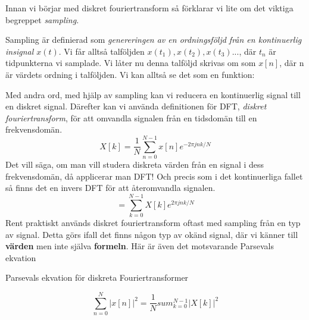 \documentclass{article}
\begin{document}
Innan vi börjar med diskret fouriertransform så förklarar vi lite om
det viktiga begreppet \emph{sampling.}

Sampling är definierad som \emph{genereringen av en ordningsföljd från en
  kontinuerlig insignal $x(t)$}.
Vi får alltså talföljden $x(t_1), x(t_2), x(t_3)... $, där $t_n$ är tidpunkterna
vi samplade. Vi låter nu denna talföljd skrivas om som $x[n]$,
där n är värdets ordning i talföljden. Vi kan alltså se det som en funktion:



Med andra ord, med hjälp av sampling kan vi reducera en kontinuerlig signal
till en diskret signal.
Därefter kan vi använda definitionen för DFT,
\emph{diskret fouriertransform}, för att omvandla signalen från en tidsdomän
till en frekvensdomän.
\begin{displaymath}
  X[k] = \frac{1}{N} \sum_{n=0}^{N-1} x[n] e^{-2 \pi j n k/N}
\end{displaymath}
Det vill säga, om man vill studera diskreta värden från en signal
i dess frekvensdomän, då applicerar man DFT! Och precis som i det kontinuerliga
fallet så finns det en invers DFT för att återomvandla signalen.
\begin{displaymath}
  [n] = \sum_{k=0}^{N-1} X[k] e^{2 \pi j n k/N}
\end{displaymath}
Rent praktiskt används diskret fouriertransform oftast med sampling från en
typ av signal. Detta görs ifall det finns någon typ av okänd signal,
där vi känner till \textbf{värden} men inte själva \textbf{formeln}.
Här är även det motsvarande Parsevals ekvation

Parsevals ekvation för diskreta Fouriertransformer

\begin{displaymath}
  \sum_{n=0}^{N} |x[n]|^2 = \frac{1}{N} sum_{k=0}^{N-1} |X[k]|^2
\end{displaymath}

\end{document}
